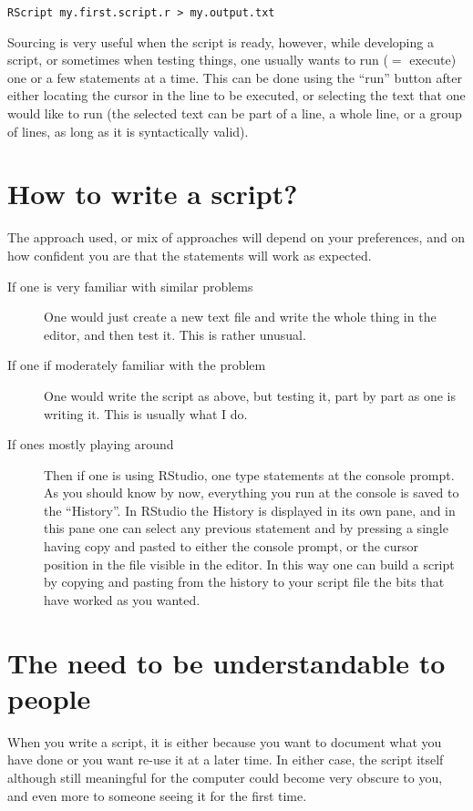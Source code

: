 \documentclass[paper=a4,10pt,div=17,headsepline,BCOR=12mm,twoside,open=right]{scrbook}\usepackage{knitr}
\begin{document}
\begin{verbatim}
RScript my.first.script.r > my.output.txt
\end{verbatim}

Sourcing is very useful when the script is ready, however, while developing a script, or sometimes when testing things, one usually wants to run ($=$ execute) one or a few statements at a time. This can be done using the ``run'' button after either locating the cursor in the line to be executed, or selecting the text that one would like to run (the selected text can be part of a line, a whole line, or a group of lines, as long as it is syntactically valid).

\section{How to write a script?}

The approach used, or mix of approaches will depend on your preferences, and on how confident you are that the statements will work as expected.
\begin{description}
\item[If one is very familiar with similar problems] One would just create a new text file and write the whole thing in the editor, and then test it. This is rather unusual.
\item[If one if moderately familiar with the problem] One would write the script as above, but testing it, part by part as one is writing it. This is usually what I do.
\item[If ones mostly playing around] Then if one is using RStudio, one type statements at the console prompt. As you should know by now, everything you run at the console is saved to the ``History''. In RStudio the History is displayed in its own pane, and in this pane one can select any previous statement and by pressing a single having copy and pasted to either the console prompt, or the cursor position in the file visible in the editor. In this way one can build a script by copying and pasting from the history to your script file the bits that have worked as you wanted.
\end{description}

\section{The need to be understandable to people}

When you write a script, it is either because you want to document what you have done or you want re-use it at a later time. In either case, the script itself although still meaningful for the computer could become very obscure to you, and even more to someone seeing it for the first time.
\end{document}
